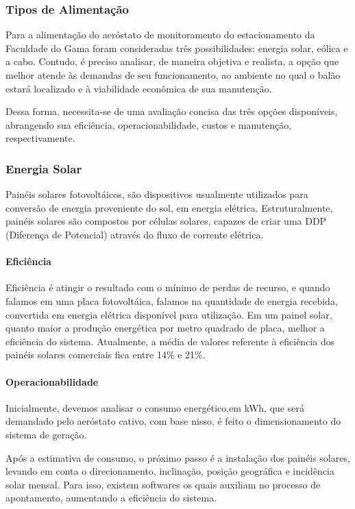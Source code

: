 \subsubsection{Tipos de Alimentação}
Para a alimentação do aeróstato de monitoramento do estacionamento da Faculdade do Gama foram consideradas três possibilidades: energia solar, eólica e a cabo.  Contudo, é preciso analisar, de maneira objetiva e realista, a opção que melhor  atende às demandas de seu funcionamento, ao ambiente no qual o balão estará localizado e à viabilidade econômica de sua manutenção.

Dessa forma, necessita-se de uma avaliação concisa das três opções disponíveis, abrangendo sua eficiência, operacionabilidade, custos e manutenção, respectivamente.
  
\subsubsection{Energia Solar}
  Painéis solares fotovoltáicos, são dispositivos usualmente utilizados para conversão de energia proveniente do sol, em energia elétrica. Estruturalmente, painéis solares são compostos por células solares, capazes de criar uma DDP (Diferença de Potencial) através do fluxo de corrente elétrica.
    
  \paragraph{Eficiência}
  Eficiência é atingir o resultado com o mínimo de perdas de recurso, e quando falamos em uma placa fotovoltáica, falamos na quantidade de energia recebida, convertida em energia elétrica disponível para utilização. Em um painel solar, quanto maior a produção energética por metro quadrado de placa, melhor a eficiência do sistema. Atualmente, a média de valores referente à eficiência dos painéis solares comerciais fica entre 14\% e 21\%.
    
  \paragraph{Operacionabilidade}
  Inicialmente, devemos analisar o consumo energético,em kWh, que será demandado pelo aeróstato cativo, com base nisso, é feito o dimensionamento do sistema de geração.
    
  Após a estimativa de consumo, o próximo passo é a instalação dos painéis solares, levando em conta o direcionamento, inclinação, posição geográfica e incidência solar mensal. Para isso, existem softwares os quais auxiliam no processo de apontamento, aumentando a eficiência do sistema.
    
